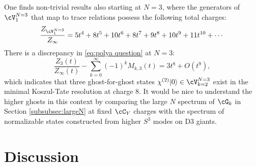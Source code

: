 \documentclass[a4paper,12pt]{article}
\begin{document}
One finds non-trivial results also starting at $N=3$, where the generators of $\cV_1^{N=3}$ that map to trace relations possess the following total charges:
\begin{equation}
\frac{Z_{\cV_1^{N=3}}}{Z_\infty} = 5 t^4 + 8 t^5 + 10 t^6 + 8 t^7 + 9 t^8 + 10 t^9 + 11 t^{10} + \cdots
\end{equation}
There is a discrepancy in \eqref{eq:polya question} at $N=3$:
\begin{equation}
\frac{Z_3(t)}{Z_\infty(t)} - \sum_{k=0}^\infty (-1)^k M_{k, 3} (t) = 3 t^{8} + O(t^{9}),
\end{equation}
which indicates that three ghost-for-ghost states $\chi^{(2)}|0\rangle \in \cV_{k=2}^{N=3}$ exist in the minimal Koszul-Tate resolution at charge $8$. It would be nice to understand the higher ghosts in this context by comparing the large $N$ spectrum of $\cG_k$ in Section \ref{subsubsec:largeN} at fixed $\cC_Y$ charges with the spectrum of normalizable states constructed from higher $S^3$ modes on D3 giants.



\section{Discussion} \label{sec:discussion}
\end{document}
